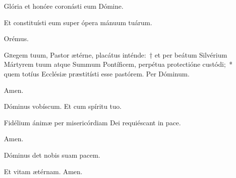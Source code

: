 
\vv Glória et honóre coronásti eum Dómine.

\rr Et constituísti eum super ópera mánuum tuárum.

\newpage

Orémus.


\lettrine{G}{r}egem tuum, Pastor ætérne, placátus inténde:~† et per beátum Silvérium Mártyrem tuum atque Summum Pontíficem, perpétua protectióne custódi;~* quem totíus Ecclésiæ præstitísti esse pastórem. Per Dóminum.

\rr Amen.

   \vv Dóminus vobíscum. \rr Et cum spíritu tuo.
   
   
  \vv Fidélium ánimæ per misericórdiam Dei requiéscant in pace.
  
  \rr Amen.
  
  
  \secreto
  
\vv Dóminus det nobis suam pacem.
  
\rr Et vitam ætérnam. Amen.

